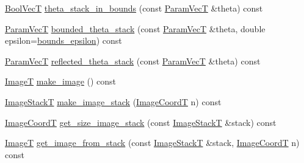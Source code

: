 \begin{DoxyCompactItemize}
\item 
\hyperlink{namespacemappel_a167d761ecce3cafb6f98c00c16bdb523}{Bool\+VecT} \hyperlink{classmappel_1_1PointEmitterModel_a7b6a59b4bc796b440025cffb7a6159f8}{theta\+\_\+stack\+\_\+in\+\_\+bounds} (const \hyperlink{classmappel_1_1PointEmitterModel_add253b568d763f1513a810aac35de719}{Param\+VecT} \&theta) const 
\item 
\hyperlink{classmappel_1_1PointEmitterModel_add253b568d763f1513a810aac35de719}{Param\+VecT} \hyperlink{classmappel_1_1PointEmitterModel_a6671c06d391ae9a09dd5de78dcc636fe}{bounded\+\_\+theta\+\_\+stack} (const \hyperlink{classmappel_1_1PointEmitterModel_add253b568d763f1513a810aac35de719}{Param\+VecT} \&theta, double epsilon=\hyperlink{classmappel_1_1PointEmitterModel_ac987a119137b85a27704b1c40e3fab8c}{bounds\+\_\+epsilon}) const 
\item 
\hyperlink{classmappel_1_1PointEmitterModel_add253b568d763f1513a810aac35de719}{Param\+VecT} \hyperlink{classmappel_1_1PointEmitterModel_ae24c17017ff5e37e1dd9ea9a1aeefa7f}{reflected\+\_\+theta\+\_\+stack} (const \hyperlink{classmappel_1_1PointEmitterModel_add253b568d763f1513a810aac35de719}{Param\+VecT} \&theta) const 
\item 
\hyperlink{classmappel_1_1ImageFormat1DBase_a521a1ff391a52a636fac4aac7c7ba02c}{ImageT} \hyperlink{classmappel_1_1ImageFormat1DBase_afa59b2dd9ba997262fa17ef7d1122996}{make\+\_\+image} () const 
\item 
\hyperlink{classmappel_1_1ImageFormat1DBase_a81e3246d1c5c37ebf9077b7b5bd25a76}{Image\+StackT} \hyperlink{classmappel_1_1ImageFormat1DBase_ab2c4470c335a6abb2d3b9c442339ca0c}{make\+\_\+image\+\_\+stack} (\hyperlink{classmappel_1_1ImageFormat1DBase_a82ab3168eb1a87eaeb3e7c919188e9fc}{Image\+CoordT} n) const 
\item 
\hyperlink{classmappel_1_1ImageFormat1DBase_a82ab3168eb1a87eaeb3e7c919188e9fc}{Image\+CoordT} \hyperlink{classmappel_1_1ImageFormat1DBase_afa0e79b58955f5ecfd39c8f8d06f22ad}{get\+\_\+size\+\_\+image\+\_\+stack} (const \hyperlink{classmappel_1_1ImageFormat1DBase_a81e3246d1c5c37ebf9077b7b5bd25a76}{Image\+StackT} \&stack) const 
\item 
\hyperlink{classmappel_1_1ImageFormat1DBase_a521a1ff391a52a636fac4aac7c7ba02c}{ImageT} \hyperlink{classmappel_1_1ImageFormat1DBase_a92d3d803a82402adcca516b53e8d5100}{get\+\_\+image\+\_\+from\+\_\+stack} (const \hyperlink{classmappel_1_1ImageFormat1DBase_a81e3246d1c5c37ebf9077b7b5bd25a76}{Image\+StackT} \&stack, \hyperlink{classmappel_1_1ImageFormat1DBase_a82ab3168eb1a87eaeb3e7c919188e9fc}{Image\+CoordT} n) const 

\end{DoxyCompactItemize}
